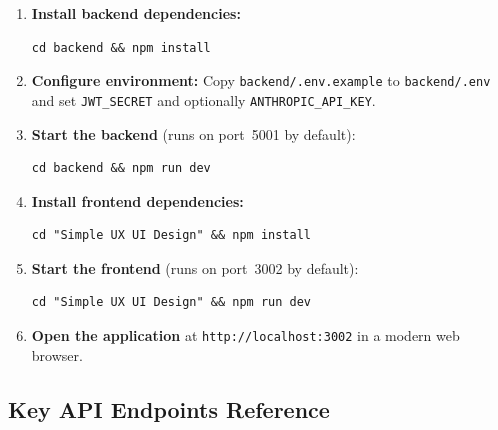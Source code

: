 \begin{enumerate}
  \item \textbf{Install backend dependencies:}
\begin{lstlisting}[language={}]
cd backend && npm install
\end{lstlisting}

  \item \textbf{Configure environment:} Copy \texttt{backend/.env.example}
  to \texttt{backend/.env} and set \texttt{JWT\_SECRET} and optionally
  \texttt{ANTHROPIC\_API\_KEY}.

  \item \textbf{Start the backend} (runs on port~5001 by default):
\begin{lstlisting}[language={}]
cd backend && npm run dev
\end{lstlisting}

  \item \textbf{Install frontend dependencies:}
\begin{lstlisting}[language={}]
cd "Simple UX UI Design" && npm install
\end{lstlisting}

  \item \textbf{Start the frontend} (runs on port~3002 by default):
\begin{lstlisting}[language={}]
cd "Simple UX UI Design" && npm run dev
\end{lstlisting}

  \item \textbf{Open the application} at
  \texttt{http://localhost:3002} in a modern web browser.
\end{enumerate}

\subsection{Key API Endpoints Reference}

